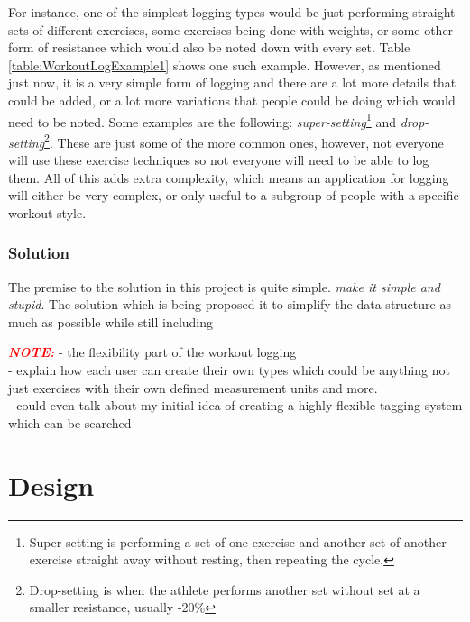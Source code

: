 \documentclass{article}
\newcommand{\vspaceconst}{-2ex}
\newcommand{\NOTE}{\textbf{\textit{\textcolor{red}{NOTE:}}} }
\begin{document}
\begin{multicols}{2}
For instance, one of the simplest logging types would be just performing straight sets of different exercises, some exercises being done with weights, or some other form of resistance which would also be noted down with every set. Table \ref{table:WorkoutLogExample1} shows one such example. However, as mentioned just now, it is a very simple form of logging and there are a lot more details that could be added, or a lot more variations that people could be doing which would need to be noted. Some examples are the following: \textit{super-setting}\footnote{Super-setting is performing a set of one exercise and another set of another exercise straight away without resting, then repeating the cycle.} and \textit{drop-setting}\footnote{Drop-setting is when the athlete performs another set without set at a smaller resistance, usually -20\%}. These are just some of the more common ones, however, not everyone will use these exercise techniques so not everyone will need to be able to log them. All of this adds extra complexity, which means an application for logging will either be very complex, or only useful to a subgroup of people with a specific workout style.


\subsubsection{Solution}
\vspace{\vspaceconst}
 
 The premise to the solution in this project is quite simple. \textit{make it simple and stupid}. The solution which is being proposed it to simplify the data structure as much as possible while still including 

\NOTE
  - the flexibility part of the workout logging\\
    - explain how each user can create their own types which could be anything not just exercises with their own defined measurement units and more. \\
    - could even talk about my initial idea of creating a highly flexible tagging system which can be searched\\

\section{Design}
\vspace{\vspaceconst}


\end{multicols}
\end{document}
